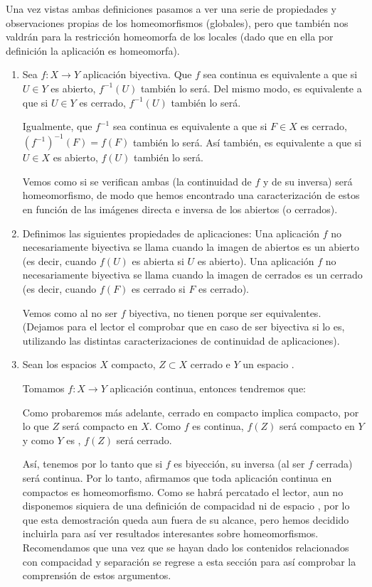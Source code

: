 Una vez vistas ambas definiciones pasamos a ver una serie de propiedades y observaciones propias de los homeomorfismos (globales), pero que también nos valdrán para la restricción homeomorfa de los locales (dado que en ella por definición la aplicación es homeomorfa).
\label{etop_obs_homeomorfismo}
\begin{obs}
	\begin{enumerate}
		\item 
		Sea $f:X\rightarrow Y$ aplicación biyectiva.
		Que $f$ sea continua es equivalente a que si $U\in Y$ es abierto, $f^{-1}(U)$ también lo será. Del mismo modo, es equivalente a que si $U\in Y$ es cerrado, $f^{-1}(U)$ también lo será.
		
		Igualmente, que $f^{-1}$ sea continua es equivalente a que si $F\in X$ es cerrado, $(f^{-1})^{-1}(F)=f(F)$ también lo será. Así también, es equivalente a que si $U\in X$ es abierto, $f(U)$ también lo será.
		
		Vemos como si se verifican ambas (la continuidad de $f$ y de su inversa) será homeomorfismo, de modo que hemos encontrado una caracterización de estos en función de las imágenes directa e inversa de los abiertos (o cerrados).
		
		\item
		Definimos las siguientes propiedades de aplicaciones:
		Una aplicación $f$ no necesariamente biyectiva se llama  cuando la imagen de abiertos es un abierto (es decir, cuando $f(U)$ es abierta si $U$ es abierto).
		Una aplicación $f$ no necesariamente biyectiva se llama  cuando la imagen de cerrados es un cerrado (es decir, cuando $f(F)$ es cerrado si $F$ es cerrado).
		
		Vemos como al no ser $f$ biyectiva, no tienen porque ser equivalentes. (Dejamos para el lector el comprobar que en caso de ser biyectiva si lo es, utilizando las distintas caracterizaciones de continuidad de aplicaciones).
		
		\item
		Sean los espacios $X$ compacto, $Z\subset X$ cerrado e $Y$ un espacio \hausdorff.
	
		 Tomamos $f: X\rightarrow Y$ aplicación continua, entonces tendremos que:
		
		Como probaremos más adelante, cerrado en compacto implica compacto, por lo que $Z$ será compacto en $X$.
		Como $f$ es continua, $f(Z)$ será compacto en $Y$ y como $Y$ es \hausdorff, $f(Z)$ será cerrado.
		
		Así, tenemos por lo tanto que si $f$ es biyección, su inversa (al ser $f$ cerrada) será continua. Por lo tanto, afirmamos que toda aplicación continua en compactos es homeomorfismo.
		Como se habrá percatado el lector, aun no disponemos siquiera de una definición de compacidad ni de espacio \hausdorff, por lo que esta demostración queda aun fuera de su alcance, pero hemos decidido incluirla para así ver resultados interesantes sobre homeomorfismos. Recomendamos que una vez que se hayan dado los contenidos relacionados con compacidad y separación se regrese a esta sección para así comprobar la comprensión de estos argumentos.
	\end{enumerate}
\end{obs}
